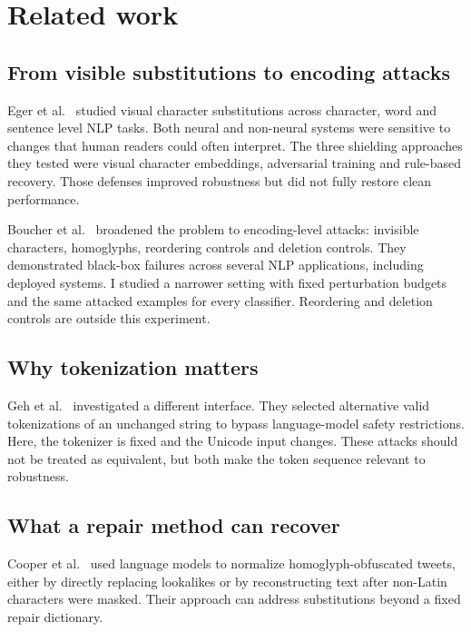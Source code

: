 \section{Related work}
\subsection{From visible substitutions to encoding attacks}
Eger et al.~\cite{eger2019visual} studied visual character substitutions across character, word and sentence level NLP tasks. Both neural and non-neural systems were sensitive to changes that human readers could often interpret. The three shielding approaches they tested were visual character embeddings, adversarial training and rule-based recovery. Those defenses improved robustness but did not fully restore clean performance.

Boucher et al.~\cite{boucher2022bad} broadened the problem to encoding-level attacks: invisible characters, homoglyphs, reordering controls and deletion controls. They demonstrated black-box failures across several NLP applications, including deployed systems. I studied a narrower setting with fixed perturbation budgets and the same attacked examples for every classifier. Reordering and deletion controls are outside this experiment.

\subsection{Why tokenization matters}
Geh et al.~\cite{geh2025adversarial} investigated a different interface. They selected alternative valid tokenizations of an unchanged string to bypass language-model safety restrictions. Here, the tokenizer is fixed and the Unicode input changes. These attacks should not be treated as equivalent, but both make the token sequence relevant to robustness.

\subsection{What a repair method can recover}
Cooper et al.~\cite{cooper2025lies} used language models to normalize homoglyph-obfuscated tweets, either by directly replacing lookalikes or by reconstructing text after non-Latin characters were masked. Their approach can address substitutions beyond a fixed repair dictionary.
